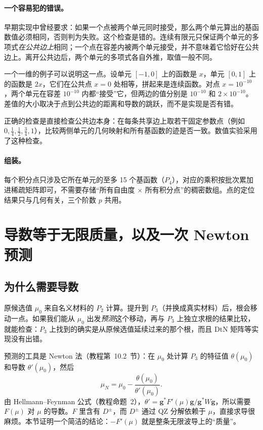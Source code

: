 \documentclass[11pt,a4paper,fontset=fandol]{ctexart}
\begin{document}
\paragraph{一个容易犯的错误。} 早期实现中曾经要求：如果一个点被两个单元同时接受，那么两个单元算出的基函数值必须相同，否则判为失败。这个检查是错的。连续有限元只保证两个单元的多项式\emph{在公共边上}相同；一个点在容差内被两个单元接受，并不意味着它恰好在公共边上。离开公共边后，两个单元的多项式各自外推，取值一般不同。

一个一维的例子可以说明这一点。设单元 $[-1,0]$ 上的函数是 $x$，单元 $[0,1]$ 上的函数是 $2x$，它们在公共点 $x=0$ 处相等，拼起来是连续函数。对点 $x=10^{-10}$，两个单元在容差 $10^{-10}$ 内都“接受”它，但两边的值分别是 $10^{-10}$ 和 $2\times10^{-10}$。差值的大小取决于点到公共边的距离和导数的跳跃，而不是实现是否有错。

正确的检查是直接检查公共边本身：在每条共享边上取若干固定参数点（例如 $0,\tfrac14,\tfrac12,\tfrac34,1$），比较两侧单元的几何映射和所有基函数的迹是否一致。数值实验采用了这种检查。

\paragraph{组装。} 每个积分点只涉及它所在单元的至多 15 个基函数（$P_4$），对应的乘积按批次累加进稀疏矩阵即可，不需要存储“所有自由度 $\times$ 所有积分点”的稠密数组。点的定位结果只与几何有关，三个阶数 $p$ 共用。

\section{导数等于无限质量，以及一次 Newton 预测}
\label{sec:deriv}

\subsection{为什么需要导数}

原候选值 $\mu_0$ 来自名义材料的 $P_2$ 计算。提升到 $P_3$（并换成真实材料）后，根会移动一点。如果我们能从 $\mu_0$ 出发\emph{预测}这个移动，再与 $P_3$ 上独立求根的结果比较，就能检查：$P_3$ 上找到的确实是从原候选值延续过来的那个根，而且 DtN 矩阵等实现没有出错。

预测的工具是 Newton 法（教程第~10.2~节）：在 $\mu_0$ 处计算 $P_3$ 的特征值 $\theta(\mu_0)$ 和导数 $\theta'(\mu_0)$，然后
\[
\mu_N=\mu_0-\frac{\theta(\mu_0)}{\theta'(\mu_0)} .
\]
由 Hellmann--Feynman 公式（教程命题~2），$\theta'=\bm g^*F'(\mu)\bm g/\bm g^*W\bm g$，所以需要 $F(\mu)$ 对 $\mu$ 的导数。$F$ 里含有 $D^\pm$，而 $D^\pm$ 通过 QZ 分解依赖于 $\mu$，直接求导很麻烦。本节证明一个简洁的结论：$-F'(\mu)$ 就是整条无限波导上的“质量”。
\end{document}
